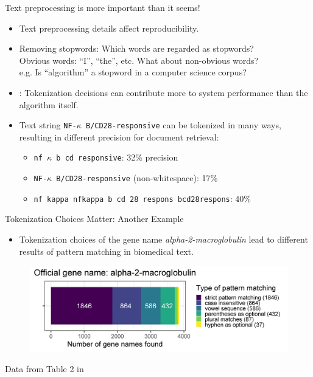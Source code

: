 \documentclass{beamer}
\renewcommand{\cite}{\citep}
\begin{document}
\begin{frame}{Text preprocessing is more important than it seems!}
\begin{itemize}
\item Text preprocessing details affect reproducibility.~\cite{roy2018clean}
\item Removing stopwords: Which words are regarded as stopwords?\\
	Obvious words: ``I'', ``the'', etc. What about non-obvious words?\\
	e.g. Is ``algorithm'' a stopword in a computer science corpus?
	\bigskip
\item\citet{trieschnigg2007influence}: Tokenization decisions can contribute more to system performance than the algorithm itself.
	\bigskip
\item Text string \texttt{NF-$\kappa$ B/CD28-responsive} can be tokenized in many ways, resulting in different precision for document retrieval:
	\begin{itemize}
	\small
	\item \texttt{nf $\kappa$ b cd responsive}: 32\% precision
	\item \texttt{NF-$\kappa$ B/CD28-responsive} (non-whitespace): 17\%
	\item \texttt{nf kappa nfkappa b cd 28 respons bcd28respons}: 40\%
	\end{itemize}
\end{itemize}
\end{frame}


\begin{frame}{Tokenization Choices Matter: Another Example}
\begin{itemize}
\item Tokenization choices of the gene name \textit{alpha-2-macroglobulin} lead to different results of pattern matching in biomedical text.
\end{itemize}
\begin{figure}[!ht]
	\centering
	\includegraphics[width=\textwidth]{Figures/cohen2002_table2_legend.png}
\end{figure}
\begin{flushright}
Data from Table 2 in~\cite{cohen2002contrast}
\end{flushright}
\end{frame}
\end{document}
